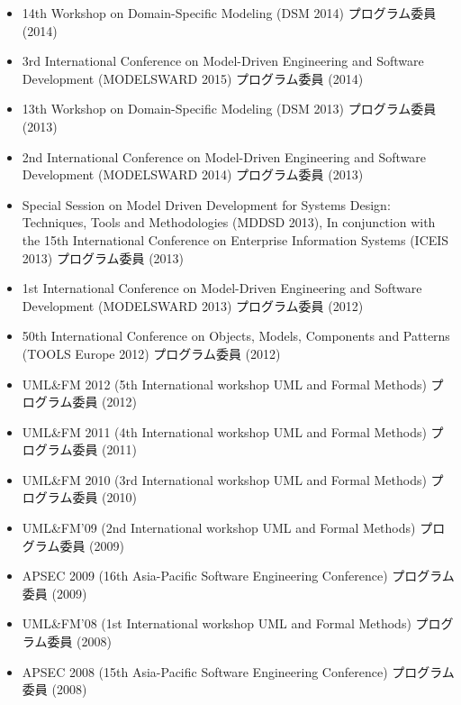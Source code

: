 \documentclass{jarticle}
\begin{document}
\begin{itemize}
\item 14th Workshop on Domain-Specific Modeling (DSM 2014) プログラム委員 (2014)

\item 3rd International Conference on Model-Driven Engineering and Software Development (MODELSWARD 2015) プログラム委員 (2014)

\item 13th Workshop on Domain-Specific Modeling (DSM 2013) プログラム委員 (2013)

\item 2nd International Conference on Model-Driven Engineering and Software Development (MODELSWARD 2014) プログラム委員 (2013)

\item Special Session on Model Driven Development for Systems Design: Techniques, Tools and Methodologies (MDDSD 2013), In conjunction with the 15th International Conference on Enterprise Information Systems (ICEIS 2013) プログラム委員 (2013)

\item 1st International Conference on Model-Driven Engineering and Software Development (MODELSWARD 2013) プログラム委員 (2012)

\item 50th International Conference on Objects, Models, Components and Patterns (TOOLS Europe 2012) プログラム委員 (2012)

\item UML\&FM 2012 (5th International workshop UML and Formal Methods) プログラム委員 (2012)

\item UML\&FM 2011 (4th International workshop UML and Formal Methods) プログラム委員 (2011)

\item UML\&FM 2010 (3rd International workshop UML and Formal Methods) プログラム委員 (2010)

\item UML\&FM'09 (2nd International workshop UML and Formal Methods) プログラム委員 (2009)

\item APSEC 2009 (16th Asia-Pacific Software Engineering Conference) プログラム委員 (2009)

\item UML\&FM'08 (1st International workshop UML and Formal Methods) プログラム委員 (2008)

\item APSEC 2008 (15th Asia-Pacific Software Engineering Conference) プログラム委員 (2008)


\end{itemize}
\end{document}
